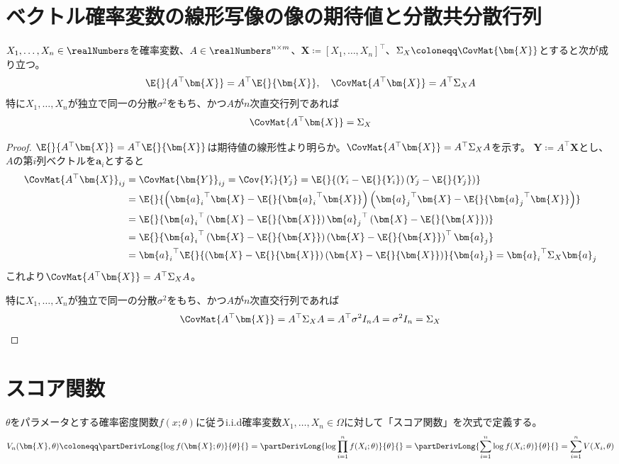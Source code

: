     \section{ベクトル確率変数の線形写像の像の期待値と分散共分散行列}
        \begin{shadebox}
            $X_1,\dotsc,X_n\in\realNumbers$を確率変数、$A\in\realNumbers^{n\times m}$、$\bm{X}\coloneqq[X_1,\dotsc,X_n]^\top$、$\Sigma_X\coloneqq\CovMat{\bm{X}}$とすると次が成り立つ。
            \[\E{}{A^\top\bm{X}} = A^\top\E{}{\bm{X}},\quad\CovMat{A^\top\bm{X}} = A^\top\Sigma_X A\]
            特に$X_1,\dotsc,X_n$が独立で同一の分散$\sigma^2$をもち、かつ$A$が$n$次直交行列であれば
            \[\CovMat{A^\top\bm{X}} = \Sigma_X\]
        \end{shadebox}
        \begin{proof}
            \newcommand{\ai}{{\bm{a}_i}}
            \newcommand{\aj}{{\bm{a}_j}}
            \quad\par
            $\E{}{A^\top\bm{X}} = A^\top\E{}{\bm{X}}$は期待値の線形性より明らか。$\CovMat{A^\top\bm{X}} = A^\top\Sigma_X A$を示す。
            $\bm{Y}\coloneqq A^\top\bm{X}$とし、$A$の第$i$列ベクトルを$\bm{a}_i$とすると
            \begin{align*}
                \CovMat{A^\top\bm{X}}_{ij} &= \CovMat{\bm{Y}}_{ij} = \Cov{Y_i}{Y_j} = \E{}{\left(Y_i-\E{}{Y_i}\right)\left(Y_j-\E{}{Y_j}\right) } \\
                &= \E{}{\left(\ai^\top\bm{X}-\E{}{\ai^\top\bm{X}}\right) \left(\aj^\top\bm{X}-\E{}{\aj^\top\bm{X}}\right)} \\
                &= \E{}{\ai^\top\left(\bm{X}-\E{}{\bm{X}}\right)\aj^\top\left(\bm{X}-\E{}{\bm{X}}\right)} \\
                &= \E{}{\ai^\top\left(\bm{X}-\E{}{\bm{X}}\right)\left(\bm{X}-\E{}{\bm{X}}\right)^\top\aj} \\
                &= \ai^\top\E{}{\left(\bm{X}-\E{}{\bm{X}}\right)\left(\bm{X}-\E{}{\bm{X}}\right)}\aj = \ai^\top\Sigma_X\aj
            \end{align*}
            これより$\CovMat{A^\top\bm{X}} = A^\top\Sigma_X A$。
            \par
            特に$X_1,\dotsc,X_n$が独立で同一の分散$\sigma^2$をもち、かつ$A$が$n$次直交行列であれば
            \[\CovMat{A^\top\bm{X}} = A^\top\Sigma_X A = A^\top\sigma^2I_n A = \sigma^2I_n = \Sigma_X\]
        \end{proof}
    \section{スコア関数}
        $\theta$をパラメータとする確率密度関数$f(x;\theta)$に従うi.i.d確率変数$X_1,\dotsc,X_n \in \Omega$に対して「スコア関数」を次式で定義する。
        \[ V_n(\bm{X},\theta) \coloneqq \partDerivLong{\log f(\bm{X};\theta)}{\theta}{} = \partDerivLong{\log \prod_{i=1}^n f(X_i;\theta)}{\theta}{} = \partDerivLong{\sum_{i=1}^n \log f(X_i;\theta)}{\theta}{} = \sum_{i=1}^n V(X_i,\theta) \]
